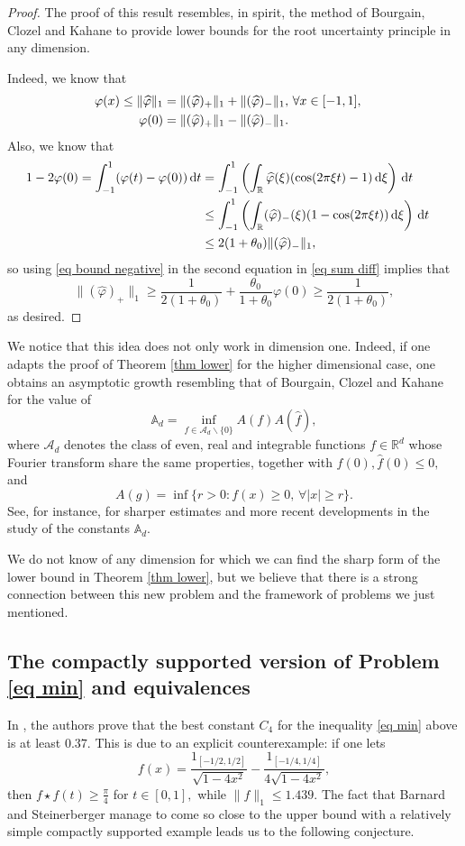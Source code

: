 \documentclass[11pt, reqno]{amsart}
\newcommand{\mmd}{ \mathrm{d}}
\newcommand{\s}{\star}
\numberwithin{equation}{section}
\newcommand{\R}{{\mathbb R}}
\begin{document}
\begin{proof} The proof of this result resembles, in spirit, the method of Bourgain, Clozel and Kahane \cite{BCK} to provide lower bounds for the root uncertainty principle in any dimension. 

Indeed, we know that
\begin{align}\label{eq sum diff}
\varphi(x) \le \|\widehat{\varphi}\|_1 & = \|(\widehat{\varphi})_+\|_1 + \|(\widehat{\varphi})_-\|_1, \, \forall x \in [-1,1],\cr 
\varphi(0) & = \|(\widehat{\varphi})_+\|_1-\|(\widehat{\varphi})_-\|_1. \cr 
\end{align}
Also, we know that 
\begin{align}\label{eq bound negative}
1 - 2 \varphi(0) = \int_{-1}^1 (\varphi(t) - \varphi(0)) \, \mmd t & = \int_{-1}^1 \left(\int_{\R}\widehat{\varphi}(\xi)(\cos(2\pi \xi t ) - 1)\, \mmd \xi\right) \, \mmd t \cr 
 & \le \int_{-1}^1 \left(\int_{\R} (\widehat{\varphi})_-(\xi) (1-\cos(2\pi \xi t)) \, \mmd \xi \right) \, \mmd t \cr 
 & \le 2(1+\theta_0) \|(\widehat{\varphi})_-\|_1,
\end{align}
so using \eqref{eq bound negative} in the second equation in \eqref{eq sum diff} implies that 
\[
\|(\widehat{\varphi})_+\|_1 \ge \frac{1}{2(1+\theta_0)} + \frac{\theta_0}{1+\theta_0}\varphi(0) \ge \frac{1}{2(1+\theta_0)},
\]
as desired. 
\end{proof}

We notice that this idea does not only work in dimension one. Indeed, if one adapts the proof of Theorem \ref{thm lower} for the higher dimensional case, one obtains an asymptotic growth resembling that of Bourgain, Clozel and Kahane \cite[Théor\'eme~3]{BCK} for
the value of 
\[
\mathbb{A}_d = \inf_{f \in \mathcal{A}_d\backslash\{0\}} A(f)A(\widehat{f}),
\]
where $\mathcal{A}_d$ denotes the class of even, real and integrable functions $f \in \R^d$ whose Fourier transform share the same properties, together with $f(0), \widehat{f}(0) \le 0,$ and 
$$
A(g) = \inf\{r > 0 \colon f(x) \ge 0, \, \forall |x| \ge r\}.
$$
See, for instance, \cite{CG,GOeSS, GOeSR1, GOeSR2} for sharper estimates and more recent developments in the study of the constants $\mathbb{A}_d.$ 

We do not know of any dimension for which we can find the sharp form of the lower bound in Theorem \ref{thm lower}, but we believe that there is a strong connection between this new problem and the framework 
of problems we just mentioned. 

\subsection{The compactly supported version of Problem \eqref{eq min} and equivalences} In \cite{BarnardSteinerberger}, the authors prove that the best constant $C_4$ for the inequality \eqref{eq min} above is at least $0.37$. This is due to an explicit counterexample:
if one lets 
\[
f(x) = \frac{1_[-1/2,1/2]}{\sqrt{1 - 4x^2}} - \frac{1_{[-1/4,1/4]}}{4\sqrt{1-4x^2}},
\]
then $f \s f(t) \ge \frac{\pi}{4}$ for $t \in [0,1],$ while $\|f\|_1 \le 1.439.$ The fact that Barnard and Steinerberger manage to come so close 
to the upper bound with a relatively simple compactly supported example leads us to the following conjecture. 
\end{document}

